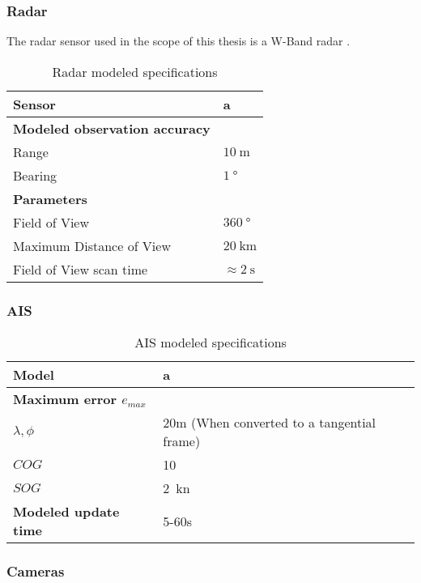 \subsubsection{Radar}
The radar sensor used in the scope of this thesis is a W-Band radar . 


\begin{table}[]
	\centering
	\caption{Radar modeled specifications}
	\label{tab:radar_specs}
	\begin{tabular}{ll}
		\hline
		\textbf{Sensor} & a \\ \hline
		\textbf{Modeled observation accuracy} &  \\
		Range & $\SI{10}{\m}$ \\
		Bearing & $\SI{1}{\degree}$ \\ \hline
		\textbf{Parameters} &  \\
		Field of View & $\SI{360}{\degree}$ \\
		Maximum Distance of View & $\SI{20}{\km}$ \\
		Field of View scan time & $\approx \SI{2}{\second}$ \\ \hline
	\end{tabular}
\end{table}
\subsubsection{AIS}

\begin{table}[H]
	\centering
	\caption{AIS modeled specifications}
	\label{tab:AIS_specs}
	\begin{tabular}{ll}
		\hline
		\textbf{Model} & a \\ \hline
		\textbf{Maximum error $e_{max}$} &  \\
		${\lambda ,\phi}$ & 20m (When converted to a tangential frame) \\
		${COG}$ & \SI{10}{\deg} \\
		${SOG}$ & \SI{2}{\knot} \\ \hline
		\textbf{Modeled update time} & 5-60s \\ \hline
	\end{tabular}
\end{table}

\subsubsection{Cameras}

